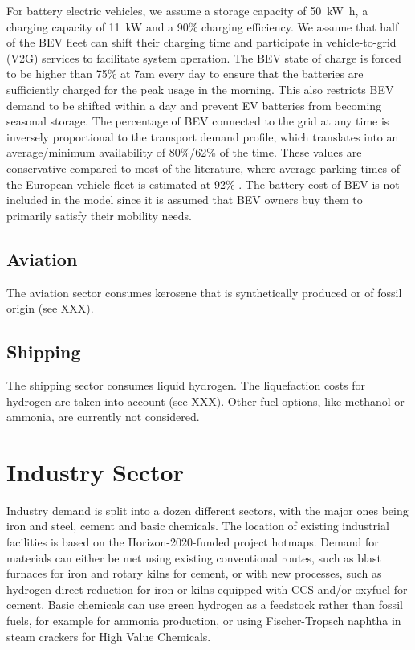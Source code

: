 For battery electric vehicles, we assume a storage capacity of
\SI{50}{\kilo\watt\hour}, a charging capacity of \SI{11}{\kilo\watt} and a 90\%
charging efficiency. We assume that half of the BEV fleet can shift their
charging time and participate in vehicle-to-grid (V2G) services to facilitate
system operation. The BEV state of charge is forced to be higher than 75\% at
7am every day to ensure that the batteries are sufficiently charged for the peak
usage in the morning. This also restricts BEV demand to be shifted within a day
and prevent EV batteries from becoming seasonal storage. The percentage of BEV
connected to the grid at any time is inversely proportional to the transport
demand profile, which translates into an average/minimum availability of
80\%/62\% of the time. These values are conservative compared to most of the
literature, where average parking times of the European vehicle fleet is
estimated at 92\% \citeS{}. The battery cost of BEV is not included in the model
since it is assumed that BEV owners buy them to primarily satisfy their mobility
needs.

\subsection{Aviation}
\label{sec:si:transport:aviation}

The aviation sector consumes kerosene that is synthetically produced or of
fossil origin (see XXX).

\subsection{Shipping}
\label{sec:si:transport:shipping}

The shipping sector consumes liquid hydrogen.
The liquefaction costs for hydrogen are taken into account (see XXX).
Other fuel options, like methanol or ammonia, are currently not considered.

\section{Industry Sector}
\label{sec:si:industry}


Industry demand is split into a dozen different sectors, with the major ones
being iron and steel, cement and basic chemicals. The location of existing
industrial facilities is based on the Horizon-2020-funded project hotmaps.
Demand for materials can either be met using existing conventional routes, such
as blast furnaces for iron and rotary kilns for cement, or with new processes,
such as hydrogen direct reduction for iron or kilns equipped with CCS and/or
oxyfuel for cement. Basic chemicals can use green hydrogen as a feedstock rather
than fossil fuels, for example for ammonia production, or using Fischer-Tropsch
naphtha in steam crackers for High Value Chemicals.

